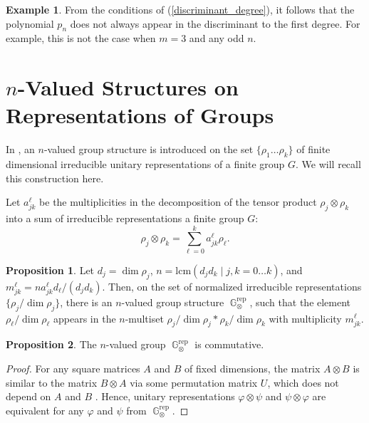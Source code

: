 \documentclass[14pt, dvipsnames]{extarticle}
\theoremstyle{definition}
\newtheorem{prop}{Proposition}
\theoremstyle{definition}
\newtheorem{example}{\bf Example}
\theoremstyle{remark}
\let\phi\varphi
\DeclareMathOperator{\G}{\mathbb{G}}
\DeclareMathOperator{\rep}{\mathrm{rep}}
\begin{document}
\begin{example}
From the conditions of (\ref{discriminant_degree}), it follows that the polynomial $p_n$ does not always appear in the discriminant to the first degree. For example, this is not the case when $m = 3$ and any odd $n$.
\end{example}














\section{$n$-Valued Structures on Representations of Groups}\label{characters}

In \cite[Theorem 5]{Buchstaber}, an $n$-valued group structure is introduced on the set $\{\rho_1\dots \rho_k\}$ of finite dimensional irreducible unitary representations of a finite group $G$. We will recall this construction here.

Let ${a_{jk}^{\ell}}$ be the multiplicities in the decomposition of the tensor product $\rho_j \otimes \rho_k$ into a sum of irreducible representations a finite group $G$:
$$\rho_j \otimes \rho_k = \sum\limits_{\ell = 0}^k a_{jk}^{\ell} \rho_{\ell}.$$

\begin{prop}
Let $d_j = \dim \rho_j$, $n = \text{lcm}(d_j d_k \mid j, k = 0\dots k)$, and $m_{jk}^{\ell} = n a_{jk}^{\ell} d_{\ell} / (d_j d_k)$. Then, on the set of normalized irreducible representations $\{\rho_j / \dim \rho_j\}$, there is an $n$-valued group structure $\G^{\rep}_{\otimes}$, such that the element $\rho_\ell / \dim \rho_\ell$ appears in the $n$-multiset $\rho_j / \dim \rho_j \ast \rho_k / \dim \rho_k$ with multiplicity $m_{jk}^{\ell}$.
\end{prop}

\begin{prop}
The $n$-valued group $\G^{\rep}_{\otimes}$ is commutative.
\end{prop}

\begin{proof}
For any square matrices $A$ and $B$ of fixed dimensions, the matrix $A \otimes B$ is similar to the matrix $B \otimes A$ via some permutation matrix $U$, which does not depend on $A$ and $B$ \cite[Corollary 4.3.10]{Horn}. Hence, unitary representations $\phi \otimes \psi$ and $\psi \otimes \phi$ are equivalent for any $\phi$ and $\psi$ from $\G^{\rep}_{\otimes}$.
\end{proof}
\end{document}
